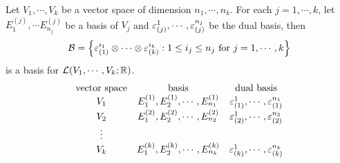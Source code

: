 \begin{proposition}\label{12.4}
    Let $V_1, \cdots, V_k$ be a vector space of dimension $n_1, \cdots, n_k$. For each $j = 1, \cdots, k$, let $E_1^{(j)}, \cdots E_{n_j}^{(j)}$ be a basis of $V_j$ and 
    $\varepsilon_{(j)}^{1}, \cdots, \varepsilon_{(j)}^{n_j}$ be the dual basis, then 
    $$\mathcal{B} = \left\{\varepsilon_{(1)}^{i_1} \otimes \cdots \otimes \varepsilon_{(k)}^{i_k}: 1\leq i_j \leq n_j \text{ for }j=1, \cdots, k\right\}$$ is a basis for $\mathcal{L}(V_1, \cdots, V_k; \mathbb{R})$.
    $$\begin{array}{ccc}
    \text{vector space} & \text{basis} & \text{dual basis} \\
    V_1 & E_1^{(1)}, E_2^{(1)}, \cdots, E_{n_1}^{(1)} & \varepsilon_{(1)}^{1}, \cdots, \varepsilon_{(1)}^{n_1}\\
    V_2 & E_1^{(2)}, E_2^{(2)}, \cdots, E_{n_2}^{(2)} & \varepsilon_{(2)}^{1}, \cdots, \varepsilon_{(2)}^{n_2}\\
    \vdots & \\
    V_k & E_1^{(k)}, E_2^{(k)}, \cdots, E_{n_k}^{(k)} & \varepsilon_{(k)}^{1}, \cdots, \varepsilon_{(k)}^{n_k}
    \end{array}$$
\end{proposition}
